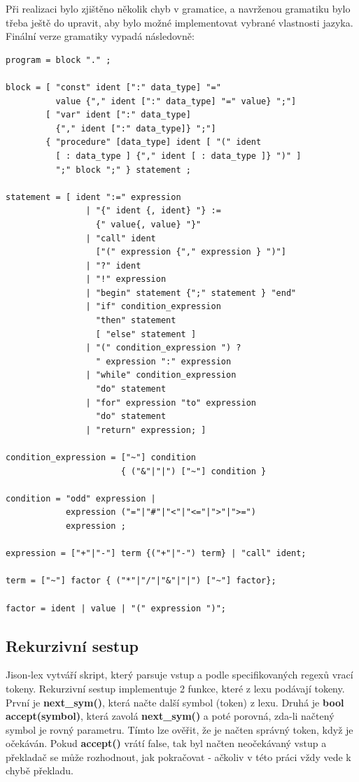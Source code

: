 \documentclass[12pt, letterpaper]{article}
\begin{document}
Při realizaci bylo zjištěno několik chyb v gramatice, a navrženou gramatiku bylo třeba ještě do upravit, aby bylo
možné implementovat vybrané vlastnosti jazyka. Finální verze gramatiky vypadá následovně:
%
\begin{lstlisting}[caption=Finální gramatika, captionpos=b]
program = block "." ;

block = [ "const" ident [":" data_type] "=" 
          value {"," ident [":" data_type] "=" value} ";"]
        [ "var" ident [":" data_type] 
          {"," ident [":" data_type]} ";"]
        { "procedure" [data_type] ident [ "(" ident 
          [ : data_type ] {"," ident [ : data_type ]} ")" ]
          ";" block ";" } statement ;

statement = [ ident ":=" expression 
                | "{" ident {, ident} "} := 
                  {" value{, value} "}" 
                | "call" ident 
                  ["(" expression {"," expression } ")"]
                | "?" ident
                | "!" expression 
                | "begin" statement {";" statement } "end" 
                | "if" condition_expression 
                  "then" statement 
                  [ "else" statement ]
                | "(" condition_expression ") ? 
                  " expression ":" expression
                | "while" condition_expression 
                  "do" statement
                | "for" expression "to" expression 
                  "do" statement
                | "return" expression; ]

condition_expression = ["~"] condition 
                       { ("&"|"|") ["~"] condition }

condition = "odd" expression |
            expression ("="|"#"|"<"|"<="|">"|">=") 
            expression ;

expression = ["+"|"-"] term {("+"|"-") term} | "call" ident;

term = ["~"] factor { ("*"|"/"|"&"|"|") ["~"] factor};

factor = ident | value | "(" expression ")";
\end{lstlisting}
%
\subsection{Rekurzivní sestup}
Jison-lex vytváří skript, který parsuje vstup a podle specifikovaných regexů vrací tokeny. Rekurzivní sestup 
implementuje 2 funkce, které z lexu podávají tokeny. První je \textbf{next\_sym()}, která načte další symbol (token) z
lexu. Druhá je \textbf{bool accept(symbol)}, která zavolá \textbf{next\_sym()} a poté porovná, zda-li načtený symbol je 
rovný parametru. Tímto lze ověřit, že je načten správný token, když je očekáván. Pokud \textbf{accept()} vrátí false,
tak byl načten neočekávaný vstup a překladač se může rozhodnout, jak pokračovat - ačkoliv v této práci vždy vede
k chybě překladu.
\end{document}
